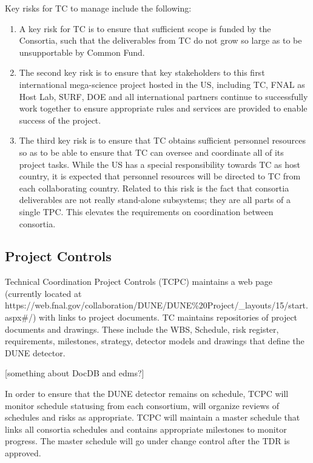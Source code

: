 Key risks for TC to manage include the following:
\begin{enumerate}
  \item A key risk for TC is to ensure that sufficient scope is funded
    by the Consortia, such that the deliverables from TC do not grow
    so large as to be unsupportable by Common Fund.
  \item The second key risk is to ensure that key stakeholders to this
    first international mega-science project hosted in the US,
    including TC, FNAL as Host Lab, SURF, DOE and all international
    partners continue to successfully work together to ensure
    appropriate rules and services are provided to enable success of
    the project.
  \item The third key risk is to ensure that TC obtains sufficient
    personnel resources so as to be able to ensure that TC can oversee
    and coordinate all of its project tasks.  While the US has a
    special responsibility towards TC as host country, it is expected
    that personnel resources will be directed to TC from each
    collaborating country. Related to this risk is the fact that
    consortia deliverables are not really stand-alone subsystems; they
    are all parts of a single TPC. This elevates the requirements on
    coordination between consortia.
\end{enumerate}


\subsection{Project Controls}
\label{sec:fdsp-coord-controls}

Technical Coordination Project Controls (TCPC) maintains a web page
(currently located at
{https://web.fnal.gov/collaboration/DUNE/DUNE\%20Project/\_layouts/15/start.aspx\#/})
with links to project documents. TC maintains
repositories of project documents and drawings. These include the WBS,
Schedule, risk register, requirements, milestones, strategy, detector
models and drawings that define the DUNE detector.

[something about DocDB and edms?]

In order to ensure that the DUNE detector remains on schedule, TCPC
will monitor schedule statusing from each consortium, will organize
reviews of schedules and risks as appropriate. TCPC will maintain a
master schedule that links all consortia schedules and contains
appropriate milestones to monitor progress. The master schedule will
go under change control after the TDR is approved.

